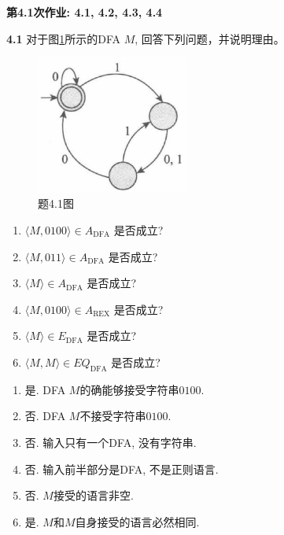 \documentclass[UTF8]{report}
\newcommand{\problem}[1]{{\setlength{\parskip}{10pt}\noindent \bf{#1}}}
\newenvironment{solution}{{\noindent\hskip 2em \bf 解 \quad}}{}
\begin{document}

\maketitle



\textbf{第4.1次作业: 4.1, 4.2, 4.3, 4.4}

\problem{4.1} 对于图\ref{fig:4_1}所示的DFA $M$, 回答下列问题，并说明理由。

\begin{figure}[!htbp]
    \centering
    \includegraphics[width=5cm]{image/4.1.png}
    \caption{题4.1图}
    \label{fig:4_1}
\end{figure}

\begin{enumerate}
    \item $\langle M,0100\rangle \in A_{\mathrm{DFA}}$ 是否成立?
    \item $\langle M,011 \rangle \in A_{\mathrm{DFA}}$ 是否成立?
    \item $\langle M\rangle \in A_{\mathrm{DFA}}$ 是否成立?
    \item $\langle M,0100 \rangle \in A_{\mathrm{REX}}$ 是否成立?
    \item $\langle M\rangle \in E_{\mathrm{DFA}}$ 是否成立?
    \item $\langle M,M\rangle \in EQ_{\mathrm{DFA}}$ 是否成立?
\end{enumerate}

\begin{solution}
    \begin{enumerate}
        \item 是. DFA $M$的确能够接受字符串$0100$.
        \item 否. DFA $M$不接受字符串$0100$.
        \item 否. 输入只有一个DFA, 没有字符串.
        \item 否. 输入前半部分是DFA, 不是正则语言.
        \item 否. $M$接受的语言非空.
        \item 是. $M$和$M$自身接受的语言必然相同.
    \end{enumerate}
\end{solution}
\end{document}
